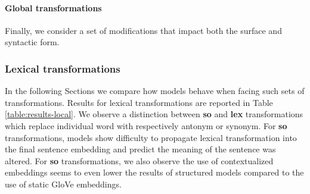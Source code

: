 \paragraph{Global transformations} Finally, we consider a set of modifications that impact both the surface and syntactic form.




\subsubsection{Lexical transformations} 



In the following Sections we compare how  models behave when facing such sets of transformations. Results for lexical transformations are reported in Table \ref{table:results-local}. We observe a distinction between \textbf{so} and \textbf{lex} transformations which replace individual word with respectively antonym or synonym. For \textbf{so} transformations, models show difficulty to propagate lexical transformation into the final sentence embedding and predict the meaning of the sentence was altered. For \textbf{so} transformations, we also observe the use of contextualized embeddings seems to even lower the results of structured models compared to the use of static GloVe embeddings.


